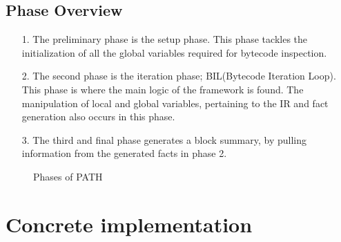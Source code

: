 \documentclass[12pt, a4paper]{report}
\theoremstyle{definition}
\theoremstyle{definition}%
\theoremstyle{definition}%
\theoremstyle{definition}%
\theoremstyle{definition}%
\theoremstyle{definition}%
\begin{document}
{        \subsection{Phase Overview}
        \label{subsec:phaseoverview}
        \begin{itemize}
            \item[1.] The preliminary phase is the setup phase. This phase tackles the initialization of all the global variables required for bytecode inspection.
            \item[2.] The second phase is the iteration phase; BIL(Bytecode Iteration Loop). This phase is where the main logic of the framework is found. The manipulation of local and global variables, pertaining to the IR and fact generation also occurs in this phase.
            \item[3.] The third and final phase generates a block summary, by pulling information from the generated facts in phase 2.   
        \end{itemize}
        
        \begin{figure}
            
            \begin{tikzpicture}
            
                [
                roundnode/.style={circle, draw=green!60, fill=green!5, very thick, minimum size=20mm},
                ellipsenew/.style={ellipse, draw=black!100, fill=green!0, very thick, minimum width = 3cm, minimum height = 4.5cm},
                rectanglenode/.style={rectangle, draw=cyan!60, fill=cyan!20, very thick, minimum width=30mm, minimum height = 10mm},
                transparentbox/.style={rectangle,draw=blue!60, fill=blue!0, ultra thick, minimum width = 75mm, minimum height = 40mm},
                ]

                
            \end{tikzpicture}

            \caption{Phases of PATH}
            \label{fig:pathphases}
        \end{figure}

    \section{Concrete implementation}
    \label{sec:concimp}

    \section{}

}
\end{document}
